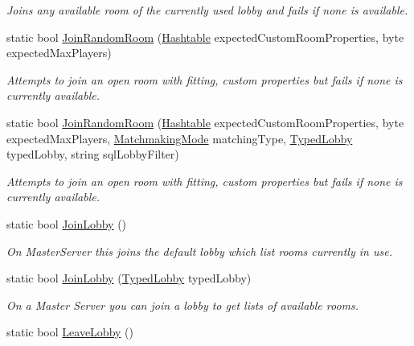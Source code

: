 \begin{DoxyCompactItemize}
\begin{DoxyCompactList}\small\item\em Joins any available room of the currently used lobby and fails if none is available. \end{DoxyCompactList}\item 
static bool \hyperlink{class_photon_network_a08119a6962c1d179a34d0388927ead3c}{Join\+Random\+Room} (\hyperlink{_extensions_8cs_afa613ef589c02dbd94acc273b62cdcfd}{Hashtable} expected\+Custom\+Room\+Properties, byte expected\+Max\+Players)
\begin{DoxyCompactList}\small\item\em Attempts to join an open room with fitting, custom properties but fails if none is currently available. \end{DoxyCompactList}\item 
static bool \hyperlink{class_photon_network_af80e5f52ce253ab5a5f81fef1435e948}{Join\+Random\+Room} (\hyperlink{_extensions_8cs_afa613ef589c02dbd94acc273b62cdcfd}{Hashtable} expected\+Custom\+Room\+Properties, byte expected\+Max\+Players, \hyperlink{namespace_exit_games_1_1_client_1_1_photon_aa8150470595f719d6f62ff9467d97c7d}{Matchmaking\+Mode} matching\+Type, \hyperlink{class_typed_lobby}{Typed\+Lobby} typed\+Lobby, string sql\+Lobby\+Filter)
\begin{DoxyCompactList}\small\item\em Attempts to join an open room with fitting, custom properties but fails if none is currently available. \end{DoxyCompactList}\item 
static bool \hyperlink{class_photon_network_a62c512b8fe143fac07ff55e849aa48d5}{Join\+Lobby} ()
\begin{DoxyCompactList}\small\item\em On Master\+Server this joins the default lobby which list rooms currently in use. \end{DoxyCompactList}\item 
static bool \hyperlink{class_photon_network_a631231346113712f11319749d6e1a3eb}{Join\+Lobby} (\hyperlink{class_typed_lobby}{Typed\+Lobby} typed\+Lobby)
\begin{DoxyCompactList}\small\item\em On a Master Server you can join a lobby to get lists of available rooms. \end{DoxyCompactList}\item 
static bool \hyperlink{class_photon_network_a941ac37ca7e275c93f3a1f95f0df84ae}{Leave\+Lobby} ()

\end{DoxyCompactItemize}
